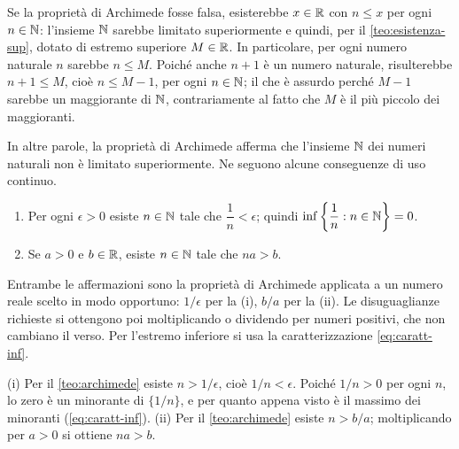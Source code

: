 \begin{dimostrazione}
Se la proprietà di Archimede fosse falsa, esisterebbe $x\in\mathbb{R}$ con $n\le x$ per ogni
$n\in\mathbb{N}$: l'insieme $\mathbb{N}$ sarebbe limitato superiormente e quindi, per il
\cref{teo:esistenza-sup}, dotato di estremo superiore $M\in\mathbb{R}$. In particolare, per ogni
numero naturale $n$ sarebbe $n\le M$. Poiché anche $n+1$ è un numero naturale,
risulterebbe $n+1\le M$, cioè $n\le M-1$, per ogni $n\in\mathbb{N}$; il che è assurdo perché
$M-1$ sarebbe un maggiorante di $\mathbb{N}$, contrariamente al fatto che $M$ è il più piccolo dei
maggioranti.
\end{dimostrazione}

In altre parole, la proprietà di Archimede afferma che l'insieme $\mathbb{N}$ dei numeri naturali
non è limitato superiormente. Ne seguono alcune conseguenze di uso continuo.

\begin{corollario}\label{cor:archimede}
\leavevmode
\begin{enumerate}
  \item Per ogni $\epsilon>0$ esiste $n\in\mathbb{N}$ tale che $\dfrac1n<\epsilon$; quindi
  $\inf\left\{ \dfrac1n : n\in\mathbb{N} \right\}=0$.
  \item Se $a>0$ e $b\in\mathbb{R}$, esiste $n\in\mathbb{N}$ tale che $na>b$.
\end{enumerate}
\end{corollario}

\begin{schema}
\end{schema}

\begin{strategia}
Entrambe le affermazioni sono la proprietà di Archimede applicata a un numero reale
scelto in modo opportuno: $1/\epsilon$ per la (i), $b/a$ per la (ii). Le disuguaglianze
richieste si ottengono poi moltiplicando o dividendo per numeri positivi, che non
cambiano il verso. Per l'estremo inferiore si usa la caratterizzazione
\eqref{eq:caratt-inf}.
\end{strategia}

\begin{dimostrazione}
(i) Per il \cref{teo:archimede} esiste $n>1/\epsilon$, cioè $1/n<\epsilon$. Poiché
$1/n>0$ per ogni $n$, lo zero è un minorante di $\{1/n\}$, e per quanto appena visto è
il massimo dei minoranti (\eqref{eq:caratt-inf}). (ii) Per il \cref{teo:archimede}
esiste $n>b/a$; moltiplicando per $a>0$ si ottiene $na>b$.
\end{dimostrazione}

